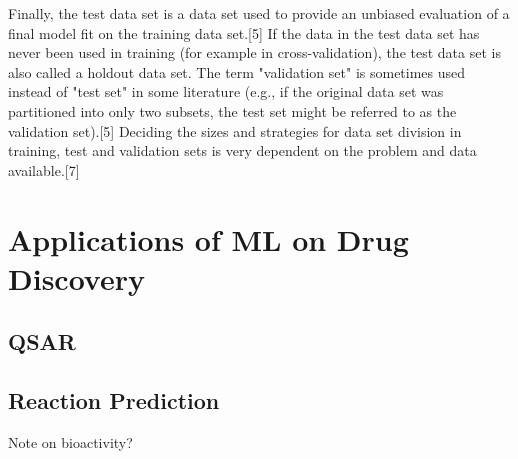 Finally, the test data set is a data set used to provide an unbiased evaluation of a final model fit on the training data set.[5] If the data in the test data set has never been used in training (for example in cross-validation), the test data set is also called a holdout data set. The term "validation set" is sometimes used instead of "test set" in some literature (e.g., if the original data set was partitioned into only two subsets, the test set might be referred to as the validation set).[5]
Deciding the sizes and strategies for data set division in training, test and validation sets is very dependent on the problem and data available.[7]

\section{Applications of ML on Drug Discovery}

\subsection{QSAR}

\subsection{Reaction Prediction}

Note on bioactivity?


